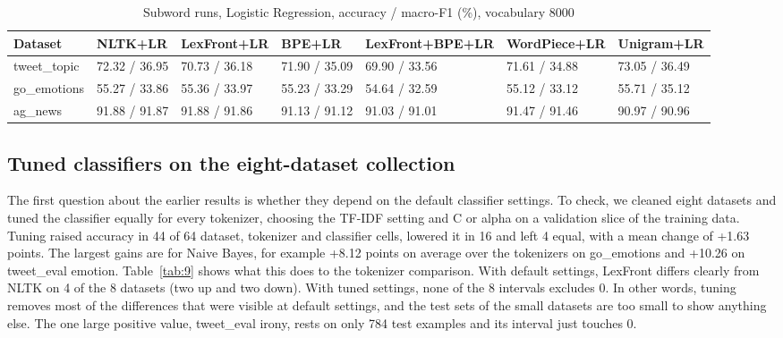 \documentclass[journal,a4paper]{IEEEtran}
\begin{document}
\begin{table}[!tb]
\caption{Subword runs, Logistic Regression, accuracy / macro-F1 (\%), vocabulary 8000}\label{tab:8}
\centering
\scriptsize
\setlength{\tabcolsep}{3pt}
\begin{tabular}{lllllll}
\toprule
\textbf{Dataset} & \textbf{NLTK+LR} & \textbf{LexFront+LR} & \textbf{BPE+LR} & \textbf{LexFront+BPE+LR} & \textbf{WordPiece+LR} & \textbf{Unigram+LR} \\
\midrule
tweet\_topic & 72.32 / 36.95 & 70.73 / 36.18 & 71.90 / 35.09 & 69.90 / 33.56 & 71.61 / 34.88 & 73.05 / 36.49 \\
go\_emotions & 55.27 / 33.86 & 55.36 / 33.97 & 55.23 / 33.29 & 54.64 / 32.59 & 55.12 / 33.12 & 55.71 / 35.12 \\
ag\_news & 91.88 / 91.87 & 91.88 / 91.86 & 91.13 / 91.12 & 91.03 / 91.01 & 91.47 / 91.46 & 90.97 / 90.96 \\
\bottomrule
\end{tabular}
\end{table}

\subsection{Tuned classifiers on the eight-dataset collection}\label{sec:4.6}
The first question about the earlier results is whether they depend on the default classifier settings. To check, we cleaned eight datasets and tuned the classifier equally for every tokenizer, choosing the TF-IDF setting and C or alpha on a validation slice of the training data. Tuning raised accuracy in 44 of 64 dataset, tokenizer and classifier cells, lowered it in 16 and left 4 equal, with a mean change of +1.63 points. The largest gains are for Naive Bayes, for example +8.12 points on average over the tokenizers on go\_emotions and +10.26 on tweet\_eval emotion. Table~\ref{tab:9} shows what this does to the tokenizer comparison. With default settings, LexFront differs clearly from NLTK on 4 of the 8 datasets (two up and two down). With tuned settings, none of the 8 intervals excludes 0. In other words, tuning removes most of the differences that were visible at default settings, and the test sets of the small datasets are too small to show anything else. The one large positive value, tweet\_eval irony, rests on only 784 test examples and its interval just touches 0.
\end{document}
